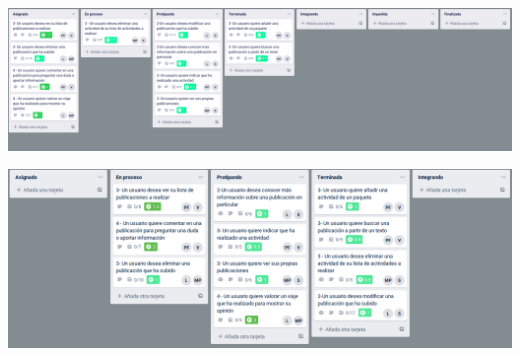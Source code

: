 \documentclass[spanish]{beamer}
\begin{document}
\begin{frame}
	\begin{center}
	\end{center}
\end{frame}

\begin{frame}
	\begin{center}
		\includegraphics[scale=0.24]{trello2_5}
	\end{center}
\end{frame}

\begin{frame}
	\begin{center}
	\end{center}
\end{frame}

\begin{frame}
	\begin{center}
		\includegraphics[scale=0.25]{trello2_6}
	\end{center}
\end{frame}

\begin{frame}
	\begin{center}
	\end{center}
\end{frame}
\end{document}
